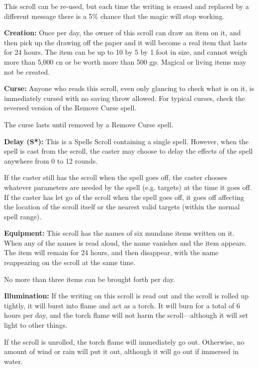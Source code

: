 \begin{multicols*}{2}
This scroll can be re-used, but each time the writing is erased and replaced by a different message there is a 5\% chance that the magic will stop working.

\textbf{Creation:} Once per day, the owner of this scroll can draw an item on it, and then pick up the drawing off the paper and it will become a real item that lasts for 24 hours. The item can be up to 10 by 5 by 1 foot in size, and cannot weigh more than 5,000 cn or be worth more than 500 gp. Magical or living items may not be created.

\textbf{Curse:} Anyone who reads this scroll, even only glancing to check what is on it, is immediately cursed with no saving throw allowed. For typical curses, check the reversed version of the Remove Curse spell.

The curse lasts until removed by a Remove Curse spell.

\textbf{Delay (S*):} This is a Spells Scroll containing a single spell. However, when the spell is cast from the scroll, the caster may choose to delay the effects of the spell anywhere from 0 to 12 rounds.

If the caster still has the scroll when the spell goes off, the caster chooses whatever parameters are needed by the spell (e.g. targets) at the time it goes off. If the caster has let go of the scroll when the spell goes off, it goes off affecting the location of the scroll itself or the nearest valid targets (within the normal spell range).

\textbf{Equipment:} This scroll has the names of six mundane items written on it. When any of the names is read aloud, the name vanishes and the item appears. The item will remain for 24 hours, and then disappear, with the name reappearing on the scroll at the same time.

No more than three items can be brought forth per day.

\textbf{Illumination:} If the writing on this scroll is read out and the scroll is rolled up tightly, it will burst into flame and act as a torch. It will burn for a total of 6 hours per day, and the torch flame will not harm the scroll—although it will set light to other things.

If the scroll is unrolled, the torch flame will immediately go out. Otherwise, no amount of wind or rain will put it out, although it will go out if immersed in water.


\end{multicols*}
